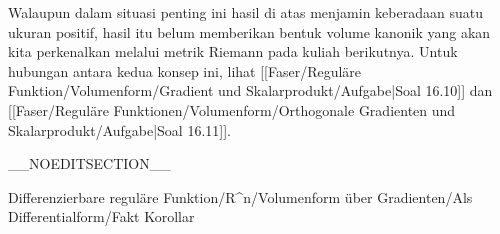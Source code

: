 Walaupun dalam situasi penting ini hasil di atas menjamin keberadaan suatu ukuran positif, hasil itu belum memberikan bentuk volume kanonik yang akan kita perkenalkan melalui metrik Riemann pada kuliah berikutnya. Untuk hubungan antara kedua konsep ini, lihat
[[Faser/Reguläre Funktion/Volumenform/Gradient und Skalarprodukt/Aufgabe|Soal 16.10]]
dan
[[Faser/Reguläre Funktionen/Volumenform/Orthogonale Gradienten und Skalarprodukt/Aufgabe|Soal 16.11]].

__NOEDITSECTION__

{Differenzierbare reguläre Funktion/R^n/Volumenform über Gradienten/Als Differentialform/Fakt}
{Korollar}
{}
{

\faktzusatz {}
\faktzusatz {}

}
